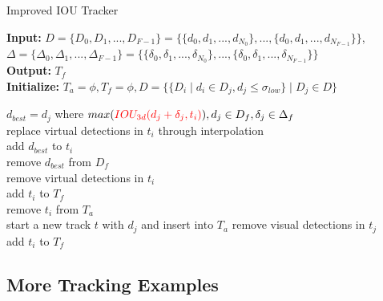 \documentclass{bmvc2k}
\begin{document}
\vspace{-0.3cm}
\begin{algorithm}
	\small
	\caption{Improved IOU Tracker}
	\label{alg:iou-tracker}
	\textbf{Input: }
	$D=\{D_0,D_1,...,D_{F-1}\} = \{\{d_0, d_1, ..., d_{N_0}\},..., \{d_0, d_1, ..., d_{N_{F-1}}\}\}$,
	$\Delta=\{\Delta_0, \Delta_1, ..., \Delta_{F-1}\} = \{\{\delta_0, \delta_1, ..., \delta_{N_0}\},...,\{\delta_0, \delta_1, ..., \delta_{N_{F-1}}\}\}$\\
	\textbf{Output: } $T_f$\\
	\textbf{Initialize:} $T_a=\phi,T_f=\phi, D = \{\{D_i \mid d_i \in D_j, d_j \leq \sigma_{low}\} \mid D_j \in D\}$
	
	{
		{
			$d_{best} = d_j$ where $max(\textcolor[rgb]{1,0,0}{IOU_{3d}(d_j+\delta_j, t_i)}), d_j \in D_f, \delta_j \in \Delta_f$\\
			{
				replace virtual detections in $t_i$ through interpolation\\
				add $d_{best}$ to $t_i$\\
				remove $d_{best}$ from $D_f$\\
			}
            {
            	remove virtual detections in $t_i$\\
				add $t_i$ to $T_f$\\
				remove $t_i$ from $T_a$\\
			}
		}
		{
			start a new track $t$ with $d_j$ and insert into $T_a$
		}
	}
	{
		remove visual detections in $t_j$\\
		{	
			add $t_i$ to $T_f$
		}
	}
\end{algorithm}

\vspace{-0.3cm}
\subsection{More Tracking Examples}
\vspace{-0.3cm}
\end{document}
